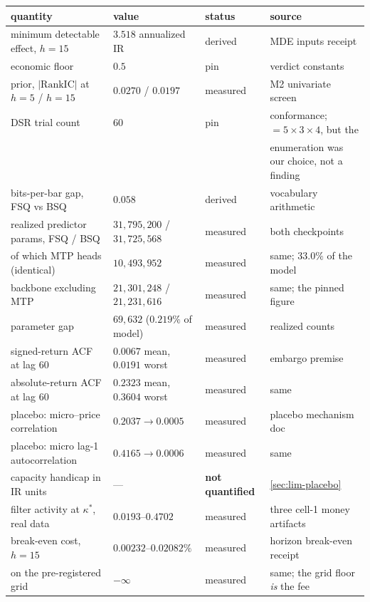 \begin{center}
\small
\begin{tabularx}{\linewidth}{lllX}
\toprule
quantity & value & status & source \\
\midrule
minimum detectable effect, $h=15$ & $3.518$ annualized IR & derived & MDE inputs receipt \\
economic floor & $0.5$ & pin & verdict constants \\
prior, $|\text{RankIC}|$ at $h=5$ / $h=15$ & $0.0270$ / $0.0197$ & measured & M2 univariate screen \\
DSR trial count & $60$ & pin & conformance; $= 5\times3\times4$, but the \\
 & & & enumeration was our choice, not a finding \\
bits-per-bar gap, FSQ vs BSQ & $0.058$ & derived & vocabulary arithmetic \\
realized predictor params, FSQ / BSQ & $31{,}795{,}200$ / $31{,}725{,}568$ & measured & both checkpoints \\
\quad of which MTP heads (identical) & $10{,}493{,}952$ & measured & same; $33.0\%$ of the model \\
\quad backbone excluding MTP & $21{,}301{,}248$ / $21{,}231{,}616$ & measured & same; the pinned figure \\
parameter gap & $69{,}632$ ($0.219\%$ of model) & measured & realized counts \\
signed-return ACF at lag 60 & $0.0067$ mean, $0.0191$ worst & measured & embargo premise \\
absolute-return ACF at lag 60 & $0.2323$ mean, $0.3604$ worst & measured & same \\
placebo: micro--price correlation & $0.2037 \to 0.0005$ & measured & placebo mechanism doc \\
placebo: micro lag-1 autocorrelation & $0.4165 \to 0.0006$ & measured & same \\
capacity handicap in IR units & --- & \textbf{not quantified} & \cref{sec:lim-placebo} \\
filter activity at $\kappa^\ast$, real data & $0.0193$--$0.4702$ & measured & three cell-1 money artifacts \\
break-even cost, $h=15$ & $0.00232$--$0.02082\%$ & measured & horizon break-even receipt \\
\quad on the pre-registered grid & $-\infty$ & measured & same; the grid floor \emph{is} the fee \\
\bottomrule
\end{tabularx}
\end{center}

